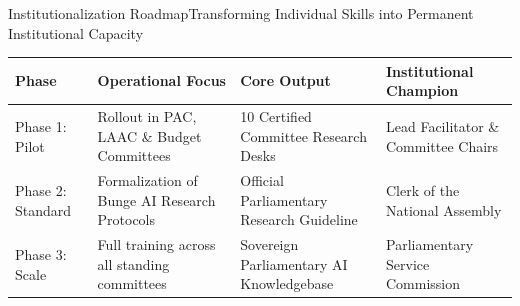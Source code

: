 \documentclass[aspectratio=169, 10pt]{beamer}
\begin{document}
\begin{frame}{Institutionalization Roadmap}{Transforming Individual Skills into Permanent Institutional Capacity}
  \begin{center}
    \small
    \begin{tabularx}{0.94\textwidth}{@{}>{}p{2.5cm}>{}p{3.5cm}>{}p{3.8cm}X@{}}
      \toprule
      \textbf{\textcolor{tanzaniablue}{Phase}} & \textbf{\textcolor{tanzaniablue}{Operational Focus}} & \textbf{\textcolor{tanzaniablue}{Core Output}} & \textbf{\textcolor{tanzaniablue}{Institutional Champion}} \\
      \midrule
      Phase 1: Pilot & Rollout in PAC, LAAC \& Budget Committees & 10 Certified Committee Research Desks & Lead Facilitator \& Committee Chairs \\
      \addlinespace
      Phase 2: Standard & Formalization of Bunge AI Research Protocols & Official Parliamentary Research Guideline & Clerk of the National Assembly \\
      \addlinespace
      Phase 3: Scale & Full training across all standing committees & Sovereign Parliamentary AI Knowledgebase & Parliamentary Service Commission \\
      \bottomrule
    \end{tabularx}
  \end{center}
\end{frame}
\end{document}

